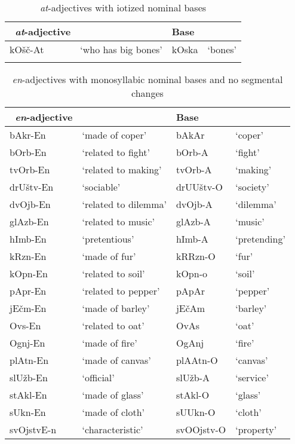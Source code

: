 \documentclass[output=paper]{langsci/langscibook}
\begin{document}
\begin{table}          
\caption{\textit{at}-adjectives with iotized nominal bases}          
\label{tabapp7}          
 \begin{tabular}{ l l l l}          
\lsptoprule            
\ \textit{at}-adjective &  & Base &
\\
\hline
kOšč-At & `who has big bones' & kOska & `bones' 
\\
 \lspbottomrule        
 \end{tabular}          
\end{table}           

\begin{table}      
\caption{\textit{en}-adjectives with monosyllabic nominal bases and no segmental changes}          
\label{tabapp8}          
 \begin{tabular}{ l l l l}          
\lsptoprule            
\ \textit{en}-adjective &  & Base & 
\\
\hline
bAkr-En & `made of coper' & bAkAr & `coper'  
\\  bOrb-En & `related to fight' & bOrb-A & `fight' 
\\  tvOrb-En & `related to making' & tvOrb-A & `making' 
\\  drUštv-En & `sociable' & drUUštv-O & `society'
\\  dvOjb-En & `related to dilemma' & dvOjb-A & `dilemma' 
\\  glAzb-En & `related to music' & glAzb-A & `music' 
\\  hImb-En & `pretentious' & hImb-A & `pretending' 
\\  kRzn-En & `made of fur' & kRRzn-O & `fur' 
\\  kOpn-En & `related to soil' & kOpn-o & `soil' 
\\  pApr-En & `related to pepper' & pApAr & `pepper' 
\\  jEčm-En & `made of barley' & jEčAm & `barley' 
\\  Ovs-En & `related to oat' & OvAs & `oat' 
\\  Ognj-En & `made of fire' & OgAnj & `fire' 
\\  plAtn-En & `made of canvas' & plAAtn-O & `canvas' 
\\  slUžb-En & `official' & slUžb-A & `service' 
\\  stAkl-En & `made of glass' & stAkl-O & `glass' 
\\  sUkn-En & `made of cloth' & sUUkn-O & `cloth' 
\\  svOjstvE-n  & `characteristic' & svOOjstv-O & `property' 

\end{tabular}
\end{table}
\end{document}
